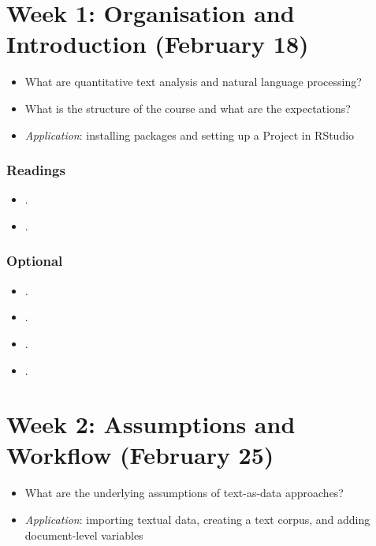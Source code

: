 \documentclass[abstract=on,parskip=full,headings=standardclasses,fontsize=11pt,paper=a4]{scrartcl}
\begin{document}
\tableofcontents

\newpage

\section{Week 1: Organisation and Introduction (February 18)}

\begin{itemize}
\renewcommand\labelitemi{--}
\item What are quantitative text analysis and natural language processing?
\item What is the structure of the course and what are the expectations?
\item \textit{Application}: installing packages and setting up a Project in RStudio
\end{itemize}

\subsubsection*{Readings}
\begin{itemize}
\item {}.
\item {}.
\end{itemize}

\subsubsection*{Optional}
\begin{itemize}
\item {}.
\item {}.
\item {}.
\item {}.
\end{itemize}


\section{Week 2: Assumptions and  Workflow (February 25)}

\begin{itemize}
\renewcommand\labelitemi{--}
\item What are the underlying assumptions of text-as-data approaches?
\item \textit{Application}: importing textual data, creating a text corpus, and adding document-level variables
\end{itemize}
\end{document}
